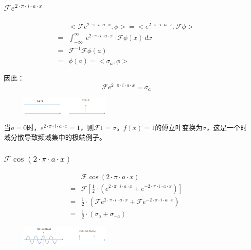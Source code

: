 \subsubsection{$\mathcal{F}e^{2\cdot \pi\cdot i\cdot a\cdot x}$}
\begin{align*}
	  & <\mathcal{F}e^{2\cdot \pi\cdot i\cdot a\cdot x},\phi>  =  <e^{2\cdot \pi\cdot i\cdot a\cdot x},\mathcal{F}\phi> \\
	= & \int_{-\infty}^{\infty}\ e^{2\cdot \pi\cdot i\cdot a\cdot x}\cdot \mathcal{F}\phi(x)\ dx                        \\
	= & \mathcal{F}^{-1}\mathcal{F}\phi(a)                                                                              \\
	= & \phi(a)= <\sigma_a,\phi>
\end{align*}

因此：
\begin{equation}
	\mathcal{F}e^{2\cdot \pi\cdot i\cdot a\cdot x}=\sigma_a
\end{equation}
\begin{figure}[H]
	\centering
	\includegraphics[width=0.4\textwidth]{assets/fe.png}
\end{figure}
当$a=0$时，$e^{2\cdot \pi\cdot i\cdot a\cdot x}=1$，则$\mathcal{F}1=\sigma$。$f(x)=1$的傅立叶变换为$\sigma$，这是一个时域分散导致频域集中的极端例子。
\subsubsection{$\mathcal{F}\cos(2\cdot\pi\cdot a\cdot x)$}
\begin{align*}
	  & \mathcal{F}\cos(2\cdot\pi\cdot a\cdot x)                                                                         \\
	= & \mathcal{F}[\frac{1}{2}\cdot(e^{2\cdot \pi\cdot i\cdot a\cdot x}+e^{-2\cdot \pi\cdot i\cdot a\cdot x})]          \\
	= & \frac{1}{2}\cdot(\mathcal{F}e^{2\cdot \pi\cdot i\cdot a\cdot x}+\mathcal{F}e^{-2\cdot \pi\cdot i\cdot a\cdot x}) \\
	= & \frac{1}{2}\cdot (\sigma_a+\sigma_{-a})
\end{align*}
\begin{figure}[H]
	\centering
	\includegraphics[width=0.4\textwidth]{assets/fcos.png}
\end{figure}
